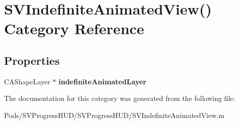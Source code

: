 \hypertarget{category_s_v_indefinite_animated_view_07_08}{}\section{S\+V\+Indefinite\+Animated\+View() Category Reference}
\label{category_s_v_indefinite_animated_view_07_08}
\subsection*{Properties}
\begin{DoxyCompactItemize}
\item 
\mbox{\label{category_s_v_indefinite_animated_view_07_08_a131d74625ea83587f75659fb572a9df1}} 
C\+A\+Shape\+Layer $\ast$ {\bfseries indefinite\+Animated\+Layer}
\end{DoxyCompactItemize}


The documentation for this category was generated from the following file\+:\begin{DoxyCompactItemize}
\item 
Pods/\+S\+V\+Progress\+H\+U\+D/\+S\+V\+Progress\+H\+U\+D/S\+V\+Indefinite\+Animated\+View.\+m\end{DoxyCompactItemize}
